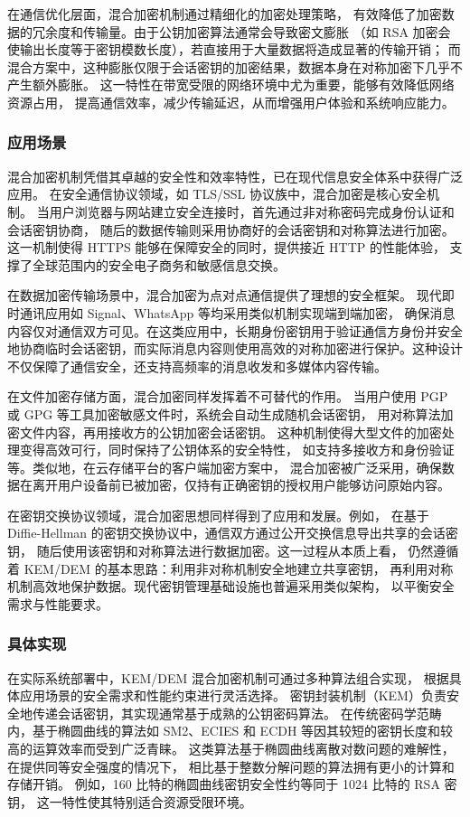 在通信优化层面，混合加密机制通过精细化的加密处理策略，
有效降低了加密数据的冗余度和传输量。由于公钥加密算法通常会导致密文膨胀
（如 RSA 加密会使输出长度等于密钥模数长度），若直接用于大量数据将造成显著的传输开销；
而混合方案中，这种膨胀仅限于会话密钥的加密结果，数据本身在对称加密下几乎不产生额外膨胀。
这一特性在带宽受限的网络环境中尤为重要，能够有效降低网络资源占用，
提高通信效率，减少传输延迟，从而增强用户体验和系统响应能力。

\subsubsection{应用场景}
混合加密机制凭借其卓越的安全性和效率特性，已在现代信息安全体系中获得广泛应用。
在安全通信协议领域，如 TLS/SSL 协议族中，混合加密是核心安全机制。
当用户浏览器与网站建立安全连接时，首先通过非对称密码完成身份认证和会话密钥协商，
随后的数据传输则采用协商好的会话密钥和对称算法进行加密。
这一机制使得 HTTPS 能够在保障安全的同时，提供接近 HTTP 的性能体验，
支撑了全球范围内的安全电子商务和敏感信息交换。

在数据加密传输场景中，混合加密为点对点通信提供了理想的安全框架。
现代即时通讯应用如 Signal、WhatsApp 等均采用类似机制实现端到端加密，
确保消息内容仅对通信双方可见。在这类应用中，长期身份密钥用于验证通信方身份并安全地协商临时会话密钥，而实际消息内容则使用高效的对称加密进行保护。这种设计不仅保障了通信安全，还支持高频率的消息收发和多媒体内容传输。

在文件加密存储方面，混合加密同样发挥着不可替代的作用。
当用户使用 PGP 或 GPG 等工具加密敏感文件时，系统会自动生成随机会话密钥，
用对称算法加密文件内容，再用接收方的公钥加密会话密钥。
这种机制使得大型文件的加密处理变得高效可行，同时保持了公钥体系的安全特性，
如支持多接收方和身份验证等。类似地，在云存储平台的客户端加密方案中，
混合加密被广泛采用，确保数据在离开用户设备前已被加密，仅持有正确密钥的授权用户能够访问原始内容。

在密钥交换协议领域，混合加密思想同样得到了应用和发展。例如，
在基于 Diffie-Hellman 的密钥交换协议中，通信双方通过公开交换信息导出共享的会话密钥，
随后使用该密钥和对称算法进行数据加密。这一过程从本质上看，
仍然遵循着 KEM/DEM 的基本思路：利用非对称机制安全地建立共享密钥，
再利用对称机制高效地保护数据。现代密钥管理基础设施也普遍采用类似架构，
以平衡安全需求与性能要求。

\subsubsection{具体实现}
在实际系统部署中，KEM/DEM 混合加密机制可通过多种算法组合实现，
根据具体应用场景的安全需求和性能约束进行灵活选择。
密钥封装机制（KEM）负责安全地传递会话密钥，其实现通常基于成熟的公钥密码算法。
在传统密码学范畴内，基于椭圆曲线的算法如 SM2、ECIES 和 ECDH
等因其较短的密钥长度和较高的运算效率而受到广泛青睐。
这类算法基于椭圆曲线离散对数问题的难解性，在提供同等安全强度的情况下，
相比基于整数分解问题的算法拥有更小的计算和存储开销。
例如，160 比特的椭圆曲线密钥安全性约等同于 1024 比特的 RSA 密钥，
这一特性使其特别适合资源受限环境。

